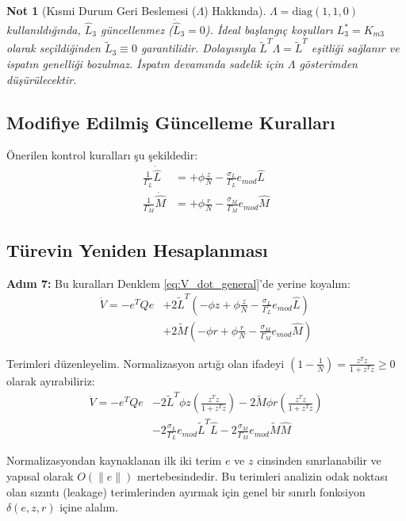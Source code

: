 \documentclass[12pt,a4paper]{article}
\newtheorem{remark}{Not}
\begin{document}
\begin{remark}[Kısmi Durum Geri Beslemesi ($\Lambda$) Hakkında]
$\Lambda = \text{diag}(1,1,0)$ kullanıldığında, $\hat{L}_3$ güncellenmez ($\dot{\hat{L}}_3 = 0$). İdeal başlangıç koşulları $L_3^* = K_{m3}$ olarak seçildiğinden $\tilde{L}_3 \equiv 0$ garantilidir. Dolayısıyla $\tilde{L}^T \Lambda = \tilde{L}^T$ eşitliği sağlanır ve ispatın genelliği bozulmaz. İspatın devamında sadelik için $\Lambda$ gösterimden düşürülecektir.
\end{remark}

\subsection{Modifiye Edilmiş Güncelleme Kuralları}
Önerilen kontrol kuralları şu şekildedir:
\begin{align}
    \frac{1}{\Gamma_L} \dot{\hat{L}} &= +\phi \frac{z}{N} - \frac{\sigma_L}{\Gamma_L} e_{mod} \hat{L} \\
    \frac{1}{\Gamma_M} \dot{\hat{M}} &= +\phi \frac{r}{N} - \frac{\sigma_M}{\Gamma_M} e_{mod} \hat{M}
\end{align}

\subsection{Türevin Yeniden Hesaplanması}
\textbf{Adım 7:} Bu kuralları Denklem \ref{eq:V_dot_general}'de yerine koyalım:
\begin{align}
    \dot{V} = -e^T Q e &+ 2 \tilde{L}^T \left( - \phi z + \phi \frac{z}{N} - \frac{\sigma_L}{\Gamma_L} e_{mod} \hat{L} \right) \nonumber \\
    &+ 2 \tilde{M} \left( - \phi r + \phi \frac{r}{N} - \frac{\sigma_M}{\Gamma_M} e_{mod} \hat{M} \right)
\end{align}

Terimleri düzenleyelim. Normalizasyon artığı olan ifadeyi $\left(1 - \frac{1}{N}\right) = \frac{z^T z}{1+z^T z} \ge 0$ olarak ayırabiliriz:
\begin{align}
    \dot{V} = -e^T Q e &- 2 \tilde{L}^T \phi z \left( \frac{z^T z}{1+z^T z} \right) - 2 \tilde{M} \phi r \left( \frac{z^T z}{1+z^T z} \right) \nonumber \\
    &- 2 \frac{\sigma_L}{\Gamma_L} e_{mod} \tilde{L}^T \hat{L} - 2 \frac{\sigma_M}{\Gamma_M} e_{mod} \tilde{M} \hat{M}
\end{align}

Normalizasyondan kaynaklanan ilk iki terim $e$ ve $z$ cinsinden sınırlanabilir ve yapısal olarak $O(\|e\|)$ mertebesindedir. Bu terimleri analizin odak noktası olan sızıntı (leakage) terimlerinden ayırmak için genel bir sınırlı fonksiyon $\delta(e, z, r)$ içine alalım.
\end{document}
